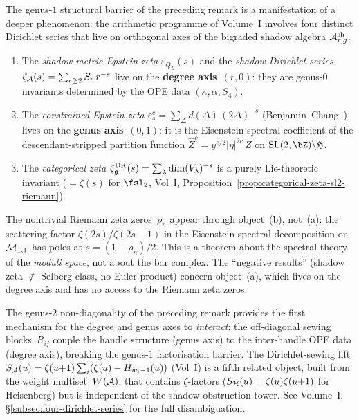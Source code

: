 \begin{remark}%
\label{rem:four-dirichlet-degree-genus}%
%
The genus-$1$ structural barrier of the preceding remark
is a manifestation of a deeper phenomenon: the arithmetic
programme of Volume~I involves four distinct Dirichlet series that
live on orthogonal axes of the bigraded shadow algebra
$\mathcal{A}^{\mathrm{sh}}_{r,g}$.

\begin{enumerate}[label=\textup{(\alph*)}]
\item The \emph{shadow-metric Epstein zeta}
 $\varepsilon_{Q_L}(s)$ and the \emph{shadow Dirichlet series}
 $\zeta_{\mathcal{A}}(s) = \sum_{r \geq 2} S_r\,r^{-s}$
 live on the \textbf{degree axis}~$(r, 0)$: they are
 genus-$0$ invariants determined by the OPE data
 $(\kappa, \alpha, S_4)$.

\item The \emph{constrained Epstein zeta}
 $\varepsilon^c_s = \sum_\Delta d(\Delta)\,(2\Delta)^{-s}$
 (Benjamin--Chang~\cite{BenjaminChang22})
 lives on the \textbf{genus axis}~$(0, 1)$: it is the Eisenstein
 spectral coefficient of the descendant-stripped partition
 function $\hat Z^c = y^{c/2}|\eta|^{2c}\,Z$ on
 $\mathrm{SL}(2,\bZ)\backslash\mathfrak{H}$.

\item The \emph{categorical zeta}
 $\zeta^{\mathrm{DK}}_{\mathfrak{g}}(s) = \sum_\lambda
 \dim(V_\lambda)^{-s}$ is a purely Lie-theoretic invariant
 ($= \zeta(s)$ for $\fsl_2$, Vol~I,
 Proposition~\ref*{prop:categorical-zeta-sl2-riemann}).
\end{enumerate}

The nontrivial Riemann zeta zeros~$\rho_n$ appear through
object~(b), not~(a): the scattering factor
$\zeta(2s)/\zeta(2s{-}1)$ in the Eisenstein spectral
decomposition on~$\mathcal{M}_{1,1}$ has poles at
$s = (1 + \rho_n)/2$. This is a theorem about the spectral
theory of the \emph{moduli space}, not about the bar complex.
The ``negative results''
(shadow zeta $\notin$ Selberg class, no Euler product)
concern object~(a), which lives on the degree axis and has
no access to the Riemann zeta zeros.

The genus-$2$ non-diagonality of the preceding remark
provides the first mechanism for the degree and genus axes to
\emph{interact}: the off-diagonal sewing blocks~$R_{ij}$
couple the handle structure (genus axis) to the inter-handle
OPE data (degree axis), breaking the genus-$1$ factorisation
barrier. The Dirichlet-sewing lift
$S_{\mathcal{A}}(u) = \zeta(u{+}1)\sum_i (\zeta(u) - H_{w_i-1}(u))$
(Vol~I) is a fifth related object, built from the weight
multiset~$W(\mathcal{A})$, that contains $\zeta$-factors
($S_{\mathcal{H}}(u) = \zeta(u)\zeta(u{+}1)$ for Heisenberg)
but is independent of the shadow obstruction tower.
See Volume~I, \S\ref*{subsec:four-dirichlet-series}
for the full disambiguation.
\end{remark}

